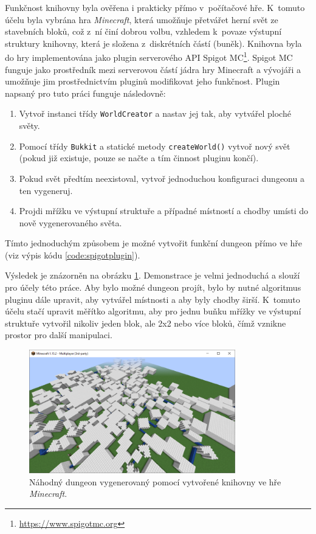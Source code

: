 Funkčnost knihovny byla ověřena i prakticky přímo v~počítačové hře.
K~tomuto účelu byla vybrána hra \textit{Minecraft}, která umožňuje přetvářet herní svět ze stavebních bloků, což z~ní činí dobrou volbu, vzhledem k~povaze výstupní struktury knihovny, která je složena z~diskrétních částí (buněk).
Knihovna byla do hry implementována jako plugin serverového API Spigot MC\footnote{\url{https://www.spigotmc.org}}.
Spigot MC funguje jako prostředník mezi serverovou částí jádra hry Minecraft a vývojáři a umožňuje jim prostřednictvím pluginů modifikovat jeho funkčnost.
Plugin napsaný pro tuto práci funguje následovně:
\begin{enumerate}
    \item Vytvoř instanci třídy \texttt{WorldCreator} a nastav jej tak, aby vytvářel ploché světy.
    \item Pomocí třídy \texttt{Bukkit} a statické metody \texttt{createWorld()} vytvoř nový svět (pokud již existuje, pouze se načte a tím činnost pluginu končí).
    \item Pokud svět předtím neexistoval, vytvoř jednoduchou konfiguraci dungeonu a ten vygeneruj.
    \item Projdi mřížku ve výstupní struktuře a případné místností a chodby umísti do nově vygenerovaného světa.
\end{enumerate}
Tímto jednoduchým způsobem je možné vytvořit funkční dungeon přímo ve hře (viz výpis kódu \ref{code:spigotplugin}).

Výsledek je znázorněn na obrázku \ref{img:mc-dungeon}.
Demonstrace je velmi jednoduchá a slouží pro účely této práce.
Aby bylo možné dungeon projít, bylo by nutné algoritmus pluginu dále upravit, aby vytvářel  místnosti a aby byly chodby širší.
K~tomuto účelu stačí upravit měřítko algoritmu, aby pro jednu buňku mřížky ve výstupní struktuře vytvořil nikoliv jeden blok, ale 2x2 nebo více bloků, čímž vznikne prostor pro další manipulaci.
\begin{figure}[ht]
    \centering
    \includegraphics[width=0.80\textwidth]{obrazky/mc-dungeon.png}
    \caption{Náhodný dungeon vygenerovaný pomocí vytvořené knihovny ve hře \textit{Minecraft}.}
    \label{img:mc-dungeon}
\end{figure}

